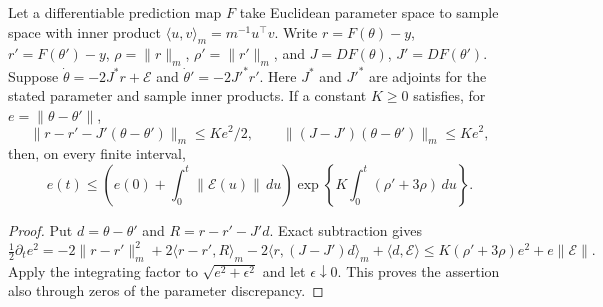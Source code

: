 \begin{lemma}
\label{cp:signed}
Let a differentiable prediction map $F$ take Euclidean parameter space
to sample space with inner product
$\langle u,v\rangle_m=m^{-1}u^\top v$.  Write $r=F(\theta)-y$,
$r'=F(\theta')-y$, $\rho=\|r\|_m$, $\rho'=\|r'\|_m$, and
$J=DF(\theta)$, $J'=DF(\theta')$.  Suppose
$\dot\theta=-2J^*r+\mathcal E$ and
$\dot\theta'=-2J'^*r'$. Here $J^*$ and $J'^*$ are adjoints for the
stated parameter and sample inner products. If a constant $K\ge0$
satisfies, for $e=\|\theta-\theta'\|$,
\[
 \|r-r'-J'(\theta-\theta')\|_m\le Ke^2/2,
 \qquad\|(J-J')(\theta-\theta')\|_m\le Ke^2,
\]
then, on every finite interval,
\begin{equation}
 e(t)\le
 \left(e(0)+\int_0^t\|\mathcal E(u)\|\,du\right)
 \exp\left\{K\int_0^t(\rho'+3\rho)\,du\right\}.
 \label{cp:eq-signed-stability}
\end{equation}
\end{lemma}
\begin{proof}
Put $d=\theta-\theta'$ and
$R=r-r'-J'd$.  Exact subtraction gives
\[
 \tfrac12\partial_t e^2
 =-2\|r-r'\|_m^2+2\langle r-r',R\rangle_m
   -2\langle r,(J-J')d\rangle_m+\langle d,\mathcal E\rangle
 \le K(\rho'+3\rho)e^2+e\|\mathcal E\|.
\]
Apply the integrating factor to $\sqrt{e^2+\epsilon^2}$ and let
$\epsilon\downarrow0$.  This proves the assertion also through zeros
of the parameter discrepancy.
\end{proof}
